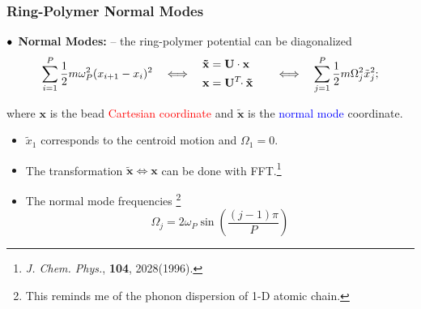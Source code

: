 \begin{frame}
  \frametitle{Ring-Polymer Normal Modes}
  $\bullet\kern1ex$\textbf{Normal Modes:} -- the ring-polymer potential can be diagonalized 
  \begin{equation*}
    \sum_{i=1}^P\frac{1}{2} m\omega_P^2(x_{i+1} - x_i)^2 
    \quad\Longleftrightarrow\quad
    \begin{aligned}
        \mathbf{\tilde{x}} &= \mathbf{U}\cdot \mathbf{x}\cr
        \mathbf{x} &= \mathbf{U}^T\!\!\cdot \mathbf{\tilde{x}}\cr
    \end{aligned}
    \quad\Longleftrightarrow\quad
    \sum_{j=1}^{P}\frac{1}{2} m\Omega_j^2\tilde{x}_j^2;
  \end{equation*}

  where $\mathbf{x}$ is the bead \textcolor{red}{Cartesian coordinate} and $\tilde{\mathbf{x}}$ is the \textcolor{blue}{normal mode}
  coordinate.

  \begin{multicols}{2}
    \begin{itemize}
        \item $\tilde{x}_1$ corresponds to the centroid motion and $\Omega_1 = 0$.
        \item The transformation $\mathbf{\tilde{x}} \Leftrightarrow \mathbf{x}$
          can be done with FFT.\footnote[frame]{
            \textit{J. Chem. Phys.}, \textbf{104}, 2028(1996).
          }
        \item The normal mode frequencies
        \footnote[frame]{
            This reminds me of the phonon dispersion of 1-D atomic chain.
            \smallskip
        }
        \begin{equation*}
            \Omega_j = 2\omega_P \sin\left({\frac{(j-1)\pi}{P}}\right)
        \end{equation*}


\end{itemize}
\end{multicols}
\end{frame}
